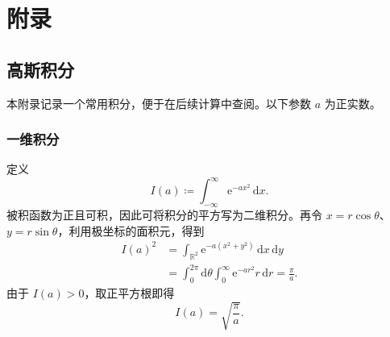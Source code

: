 \chapter{附录}

\section{高斯积分}

本附录记录一个常用积分，便于在后续计算中查阅。以下参数 $a$ 为正实数。

\subsection{一维积分}

定义
\begin{equation}
  I(a)\coloneqq\int_{-\infty}^{\infty}\mathrm{e}^{-ax^{2}}\,\mathrm{d}x.
\end{equation}
被积函数为正且可积，因此可将积分的平方写为二维积分。再令
$x=r\cos\theta$、$y=r\sin\theta$，利用极坐标的面积元，得到
\begin{align}
  I(a)^{2}
  &=\int_{\mathbb{R}^{2}}\mathrm{e}^{-a(x^{2}+y^{2})}\,\mathrm{d}x\,\mathrm{d}y\\
  &=\int_{0}^{2\pi}\mathrm{d}\theta\int_{0}^{\infty}
    \mathrm{e}^{-ar^{2}}r\,\mathrm{d}r
   =\frac{\pi}{a}.
\end{align}
由于 $I(a)>0$，取正平方根即得
\begin{equation}
  I(a)=\sqrt{\frac{\pi}{a}}.
\end{equation}
